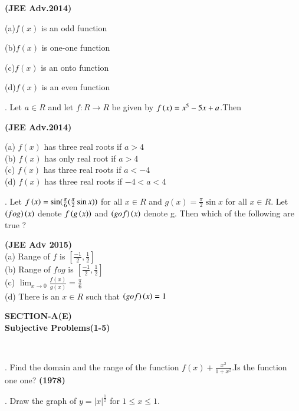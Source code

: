 \documentclass[journal,12pt,twocolumn]{IEEEtran}
\theoremstyle{remark}
\begin{document}
\begin{enumerate}
\hfill\textbf{(JEE Adv.2014)}

(a)$f(x)$ is an odd function

(b)$f(x)$ is one-one function

(c)$f(x)$ is an onto function

(d)$f(x)$ is an even function\\

\item[\textbf{10}]. Let $a \in R$ and let $f:R\rightarrow{R}$ be given by $f\left(x\right)=x^5-5x+a$.Then

\hfill\textbf{(JEE Adv.2014)}

(a) $f(x)$ has three real roots if $a>4$\\
(b) $f(x)$ has only real root if $a>4$\\
(c) $f(x)$ has three real roots if $a<-4$\\
(d) $f(x)$ has three real roots if $-4<a<4$\\

\item[\textbf{11}]. Let $f\left(x\right)=\sin(\frac{\pi}{6}(\frac{\pi}{2}\sin{x}))$ for all $x \in R $ and $g(x)=\frac{\pi}{2}\sin{x}$ for all $x \in R$. Let $\left(fog\right)\left(x\right)$ denote $f\left(g\left(x\right)\right)$ and $\left(gof\right)\left(x\right)$ denote g. Then which of the following are true $?$

\hfill\textbf{(JEE Adv 2015)}\\
(a) Range of $f$ is $[\frac{-1}{2},\frac{1}{2}]$\\
(b) Range of $fog$ is $[\frac{-1}{2},\frac{1}{2}]$\\
(c) $\lim_{x\rightarrow{0}}\frac{f(x)}{g(x)}=\frac{\pi}{6}$\\
(d) There is an $x \in R$ such that $\left(gof\right)\left(x\right)=1$\\
\begin{center}
    \item 
      \textbf{SECTION-A(E)\\Subjective Problems(1-5)}\\
      
      
\end{center}

\
\item[\textbf{1}]. Find the domain and the range of the function $f(x)+\frac{x^2}{1+x^2}$.Is the function one one? 
    \hfill\textbf{(1978)}\\
     \item[\textbf{2}]. Draw the graph of $y=|x|^{\frac{1}{2}}$ for $1\le x \le1.$
     

\end{enumerate}
\end{document}
